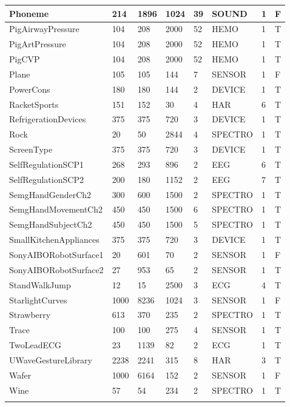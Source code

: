 \begin{landscape}
\begin{longtable}{|*{8}l|}
        Phoneme & 214 & 1896 & 1024 & 39 & SOUND & 1 & F \\
        \hline
        PigAirwayPressure & 104 & 208 & 2000 & 52 & HEMO & 1 & T \\
        \hline
        PigArtPressure & 104 & 208 & 2000 & 52 & HEMO & 1 & T \\
        \hline
        PigCVP & 104 & 208 & 2000 & 52 & HEMO & 1 & T \\
        \hline
        Plane & 105 & 105 & 144 & 7 & SENSOR & 1 & F \\
        \hline
        PowerCons & 180 & 180 & 144 & 2 & DEVICE & 1 & T \\
        \hline
        RacketSports & 151 & 152 & 30 & 4 & HAR & 6 & T \\
        \hline
        RefrigerationDevices & 375 & 375 & 720 & 3 & DEVICE & 1 & T \\
        \hline
        Rock & 20 & 50 & 2844 & 4 & SPECTRO & 1 & T \\
        \hline
        ScreenType & 375 & 375 & 720 & 3 & DEVICE & 1 & T \\
        \hline
        SelfRegulationSCP1 & 268 & 293 & 896 & 2 & EEG & 6 & T \\
        \hline
        SelfRegulationSCP2 & 200 & 180 & 1152 & 2 & EEG & 7 & T \\
        \hline
        SemgHandGenderCh2 & 300 & 600 & 1500 & 2 & SPECTRO & 1 & T \\
        \hline
        SemgHandMovementCh2 & 450 & 450 & 1500 & 6 & SPECTRO & 1 & T \\
        \hline
        SemgHandSubjectCh2 & 450 & 450 & 1500 & 5 & SPECTRO & 1 & T \\
        \hline
        SmallKitchenAppliances & 375 & 375 & 720 & 3 & DEVICE & 1 & T \\
        \hline
        SonyAIBORobotSurface1 & 20 & 601 & 70 & 2 & SENSOR & 1 & F \\
        \hline
        SonyAIBORobotSurface2 & 27 & 953 & 65 & 2 & SENSOR & 1 & T \\
        \hline
        StandWalkJump & 12 & 15 & 2500 & 3 & ECG & 4 & T \\
        \hline
        StarlightCurves & 1000 & 8236 & 1024 & 3 & SENSOR & 1 & F \\
        \hline
        Strawberry & 613 & 370 & 235 & 2 & SPECTRO & 1 & T \\
        \hline
        Trace & 100 & 100 & 275 & 4 & SENSOR & 1 & T \\
        \hline
        TwoLeadECG & 23 & 1139 & 82 & 2 & ECG & 1 & T \\
        \hline
        UWaveGestureLibrary & 2238 & 2241 & 315 & 8 & HAR & 3 & T \\
        \hline
        Wafer & 1000 & 6164 & 152 & 2 & SENSOR & 1 & F \\
        \hline
        Wine & 57 & 54 & 234 & 2 & SPECTRO & 1 & T \\
        \hline
        \label{tab:long}
    \end{longtable}
\end{landscape}


